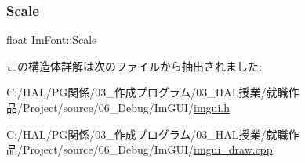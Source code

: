 \mbox{\label{struct_im_font_ae98fb07fd8862a7243d77b11f38bba19}} 
\subsubsection{\texorpdfstring{Scale}{Scale}}
{\footnotesize\ttfamily float Im\+Font\+::\+Scale}



この構造体詳解は次のファイルから抽出されました\+:\begin{DoxyCompactItemize}
\item 
C\+:/\+H\+A\+L/\+P\+G関係/03\+\_\+作成プログラム/03\+\_\+\+H\+A\+L授業/就職作品/\+Project/source/06\+\_\+\+Debug/\+Im\+G\+U\+I/\mbox{\hyperlink{imgui_8h}{imgui.\+h}}\item 
C\+:/\+H\+A\+L/\+P\+G関係/03\+\_\+作成プログラム/03\+\_\+\+H\+A\+L授業/就職作品/\+Project/source/06\+\_\+\+Debug/\+Im\+G\+U\+I/\mbox{\hyperlink{imgui__draw_8cpp}{imgui\+\_\+draw.\+cpp}}\end{DoxyCompactItemize}
